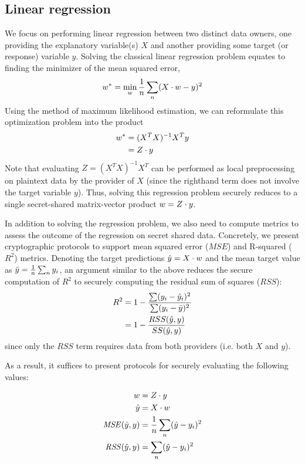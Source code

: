 
\subsection{Linear regression}
\label{sec:linreg}

We focus on performing linear regression between two distinct data owners, one providing the explanatory variable(s) $X$ and another providing some target (or response) variable $y$. Solving the classical linear regression problem equates to finding the minimizer of the mean squared error, 
\begin{align*}
w^* = \min_{w}\frac{1}{n} \sum_n (X \cdot w - y)^2
\end{align*}
Using the method of maximum likelihood estimation, we can reformulate this optimization problem into the product
\begin{align*}
w^* &= (X^TX)^{-1}X^Ty
\\
&= Z \cdot y
\end{align*}
Note that evaluating $Z = (X^TX)^{-1}X^T$ can be performed as local preprocessing on plaintext data by the provider of $X$ (since the righthand term does not involve the target variable $y$). Thus, solving this regression problem securely reduces to a single secret-shared matrix-vector product $w = Z \cdot y$.

In addition to solving the regression problem, we also need to compute metrics to assess the outcome of the regression on secret shared data. Concretely, we present cryptographic protocols to support mean squared error ($MSE$) and R-squared ($R^2$) metrics. Denoting the target predictions $\hat{y} = X \cdot w$ and the mean target value as $\bar{y} = \frac{1}{n} \sum_n y_i$, an argument similar to the above reduces the secure computation of $R^2$ to securely computing the residual sum of squares ($RSS$):
\begin{align*}
R^2 &= 1 - \frac{\sum(y_i - \hat{y}_i)^2}{\sum(y_i - \bar{y})^2}
\\
&= 1 - \frac{RSS(\hat{y}, y)}{SS(\hat{y}, y)}
\end{align*}
since only the $RSS$ term requires data from both providers (i.e. both $X$ and $y$). 

As a result, it suffices to present protocols for securely evaluating the following values:

\begin{align*}
w &= Z \cdot y
\\
\hat{y} &= X \cdot w
\\
\mathit{MSE}(\hat{y}, y) &= \frac{1}{n} \sum_n (\hat{y} - y_i)^2 
\\
\mathit{RSS}(\hat{y}, y) &= \sum_n (\hat{y} - y_i)^2 
\end{align*}

